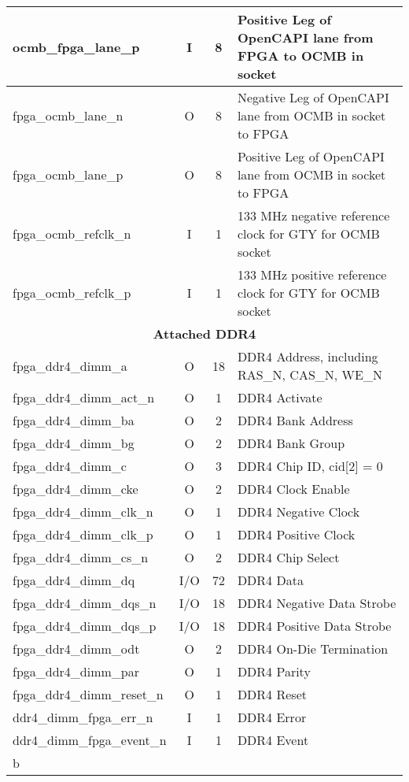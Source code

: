 \begin{center}
\begin{longtable}{ l | c | c | p{.55\linewidth} }
    ocmb\_fpga\_lane\_p        & I   & 8    & Positive Leg of OpenCAPI lane from FPGA to OCMB in socket \\ \hline
    fpga\_ocmb\_lane\_n        & O   & 8    & Negative Leg of OpenCAPI lane from OCMB in socket to FPGA \\ \hline
    fpga\_ocmb\_lane\_p        & O   & 8    & Positive Leg of OpenCAPI lane from OCMB in socket to FPGA \\ \hline
    fpga\_ocmb\_refclk\_n      & I   & 1    & 133 MHz negative reference clock for GTY for OCMB socket \\ \hline
    fpga\_ocmb\_refclk\_p      & I   & 1    & 133 MHz positive reference clock for GTY for OCMB socket \\ \hline
    \multicolumn{4}{c}{\textbf{Attached DDR4}} \\ \hline
    fpga\_ddr4\_dimm\_a        & O   & 18   & DDR4 Address, including RAS\_N, CAS\_N, WE\_N \\ \hline
    fpga\_ddr4\_dimm\_act\_n   & O   & 1    & DDR4 Activate \\ \hline
    fpga\_ddr4\_dimm\_ba       & O   & 2    & DDR4 Bank Address \\ \hline
    fpga\_ddr4\_dimm\_bg       & O   & 2    & DDR4 Bank Group \\ \hline
    fpga\_ddr4\_dimm\_c        & O   & 3    & DDR4 Chip ID, cid[2] = 0 \\ \hline
    fpga\_ddr4\_dimm\_cke      & O   & 2    & DDR4 Clock Enable \\ \hline
    fpga\_ddr4\_dimm\_clk\_n   & O   & 1    & DDR4 Negative Clock \\ \hline
    fpga\_ddr4\_dimm\_clk\_p   & O   & 1    & DDR4 Positive Clock \\ \hline
    fpga\_ddr4\_dimm\_cs\_n    & O   & 2    & DDR4 Chip Select \\ \hline
    fpga\_ddr4\_dimm\_dq       & I/O & 72   & DDR4 Data \\ \hline
    fpga\_ddr4\_dimm\_dqs\_n   & I/O & 18   & DDR4 Negative Data Strobe \\ \hline
    fpga\_ddr4\_dimm\_dqs\_p   & I/O & 18   & DDR4 Positive Data Strobe \\ \hline
    fpga\_ddr4\_dimm\_odt      & O   & 2    & DDR4 On-Die Termination \\ \hline
    fpga\_ddr4\_dimm\_par      & O   & 1    & DDR4 Parity \\ \hline
    fpga\_ddr4\_dimm\_reset\_n & O   & 1    & DDR4 Reset \\ \hline
    ddr4\_dimm\_fpga\_err\_n   & I   & 1    & DDR4 Error \\ \hline
    ddr4\_dimm\_fpga\_event\_n & I   & 1    & DDR4 Event \\
b  \end{longtable}
\end{center}

